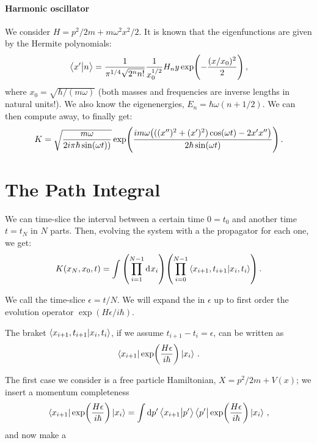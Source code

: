 \documentclass[main.tex]{subfiles}
\begin{document}
\paragraph{Harmonic oscillator}

We consider \(H = p^2/2m + m \omega^2 x^2 / 2\). It is known that the eigenfunctions are given by the Hermite polynomials: 
%
\begin{equation}
  \braket{x'}{n} = \frac{1}{\pi^{1/4} \sqrt{2^{n} n!}} \frac{1}{x_0^{1/2}} H_n y \exp(-\frac{(x/x_0)^2}{2}) 
\,,
\end{equation}
%
where \(x_0 = \sqrt{\hbar / (m \omega )} \) (both masses and frequencies are inverse lengths in natural units!). We also know the eigenenergies, \(E_n = \hbar \omega (n+1/2)\). We can then compute away, to finally get: 
%
\begin{equation}
  K = \sqrt{\frac{m \omega }{2 i \pi \hbar \sin(\omega t))}}
  \exp(\frac{im \omega \qty(((x'')^2+(x')^2)\cos(\omega t)-2x'x'' )}{2 \hbar \sin(\omega t) })  
\,.
\end{equation}
%

\section{The Path Integral}

We can time-slice the interval between a certain time \(0 = t_0\) and another time \(t = t_N\) in \(N\) parts. Then, evolving the system with a the propagator for each one, we get: 
%
\begin{equation}
  K(x_N, x_0, t) = 
  \int \qty(\prod _{i=1}^{N-1} \dd[]{x_i}) \qty(\prod_{i=0}^{N-1}\braket{x_{i+1}, t_{i+1}}{x_i, t_i})  
\,.
\end{equation}

We call the time-slice \(\epsilon = t/N\). We will expand the in \(\epsilon \) up to first order the evolution operator \(\exp(H \epsilon /i \hbar) \).

The braket \(\braket{x_{i+1}, t_{i+1}}{x_{i}, t_{i}} \), if we assume \(t_{i+1} - t_i = \epsilon \), can be written as 
%
\begin{equation}
  \bra{x_{i+1}} \exp(\frac{H \epsilon }{i \hbar}) \ket{x_i}
\,.
\end{equation}

The first case we consider is a free particle Hamiltonian, \(X = p^2/2m + V(x)\); we insert a momentum completeness 
%
\begin{equation}
  \bra{x_{i+1}} \exp(\frac{H \epsilon }{i \hbar}) \ket{x_i}
  = \int  \dd{p'} \braket{x_{i+1}}{p'} \bra{p'} 
  \exp(\frac{H \epsilon }{i \hbar}) \ket{x_i}   
\,,
\end{equation}
%
and now make a 
\end{document}
